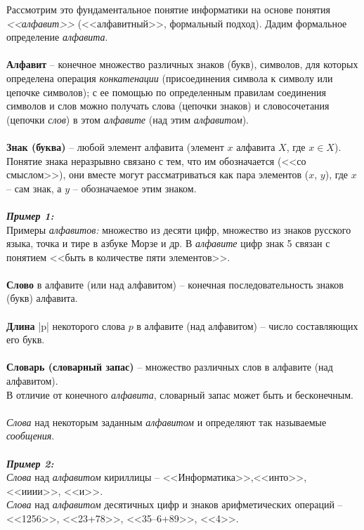 \newpage 
Рассмотрим это фундаментальное понятие информатики на основе понятия \textit{<<алфавит>>} (<<алфавитный>>, формальный подход). Дадим формальное определение \textit{алфавита}.
\\
\\\textbf{Алфавит} -- конечное множество различных знаков (букв), символов, для которых определена операция \emph{конкатенации} (присоединения символа к символу или цепочке символов); с ее помощью по определенным правилам соединения символов и слов можно получать слова (цепочки знаков) и словосочетания (цепочки \textit{слов}) в этом \textit{алфавите} (над этим \textit{алфавитом}).
\\
\\\textbf{Знак (буква)} -- любой элемент алфавита (элемент $x$ алфавита $X$, где $x \in X$). Понятие знака неразрывно связано с тем, что им обозначается (<<со смыслом>>), они вместе могут рассматриваться как пара элементов ($x$, $y$), где $x$ – сам знак, а $y$ – обозначаемое этим знаком.\\
\\\emph{\textbf{Пример 1:}}
\\Примеры \emph{алфавитов:} множество из десяти цифр, множество из знаков русского языка, точка и тире в азбуке Морзе и др. В \emph{алфавите} цифр знак 5 связан с понятием <<быть в количестве пяти элементов>>.\\
\\\textbf{Слово} в алфавите (или над алфавитом) -- конечная последовательность знаков (букв) алфавита.
\\
\\\textbf{Длина} |p| некоторого слова $p$ в алфавите (над алфавитом) -- число составляющих его букв.
\\
\\\textbf{Словарь (словарный запас)} -- множество различных слов в алфавите (над алфавитом).
\\В отличие от конечного \emph{алфавита}, словарный запас может быть и бесконечным.\\
\\\emph{Слова} над некоторым заданным \emph{алфавитом} и определяют так называемые \emph{сообщения}.\\
\\\emph{\textbf{Пример 2:}}
\\\emph{Слова} над \emph{алфавитом} кириллицы -- <<Информатика>>,<<инто>>, <<ииии>>, <<и>>. 
\\\emph{Слова} над \emph{алфавитом} десятичных цифр и знаков арифметических операций – <<1256>>, <<23+78>>, <<35–6+89>>, <<4>>. 
